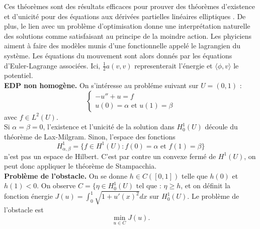 Ces théorèmes sont des résultats efficaces pour prouver des théorèmes d'existence et d'unicité pour des équations aux dérivées partielles linéaires elliptiques \cite{brezis2010}. De plus, le lien avec un problème d'optimisation donne une interprétation naturelle des solutions comme satisfaisant au principe de la moindre action. Les phyiciens aiment à faire des modèles munis d'une fonctionnelle appelé le lagrangien du système. Les équations du mouvement sont alors donnés par les équations d'Euler-Lagrange associées. Ici, $\frac{1}{2}a(v,v)$ representerait l'énergie et $\langle \phi , v\rangle$ le potentiel.\\

 \textbf{EDP non homogène.} On s'intéresse au probléme suivant sur $U=(0,1)$ :
\[\left\{\begin{array}{c}-u'' +u =f \\ u(0)=\alpha \text{ et } u(1)=\beta \end{array}\right.\]
avec $f\in L^2(U)$.\\

Si $\alpha=\beta=0$, l'existence et l'unicité de la solution dans $H_0^1(U)$ découle du théorème de Lax-Milgram. Sinon, l'espace des fonctions
\[H_{\alpha,\beta}^1 = \{ f\in H^1(U) : f(0)=\alpha \text{ et } f(1)=\beta \}\]
n'est pas un espace de Hilbert. C'est par contre un convexe fermé de $H^1(U)$, on peut donc appliquer le théorème de Stampacchia.\\

\textbf{Problème de l'obstacle.} On se donne $h\in C([0,1])$ telle que $h(0)$ et $h(1)<0$. On observe $C = \{ \eta\in H_0^1(U) \text{ tel que : }\eta \geq h $, et on définit la fonction énergie $J(u)=\int_0^1 \sqrt{1+u'(x)^2} dx$ sur $H_0^1(U)$. Le problème de l'obstacle est 
\[\min_{u\in C} J(u).\]
 


